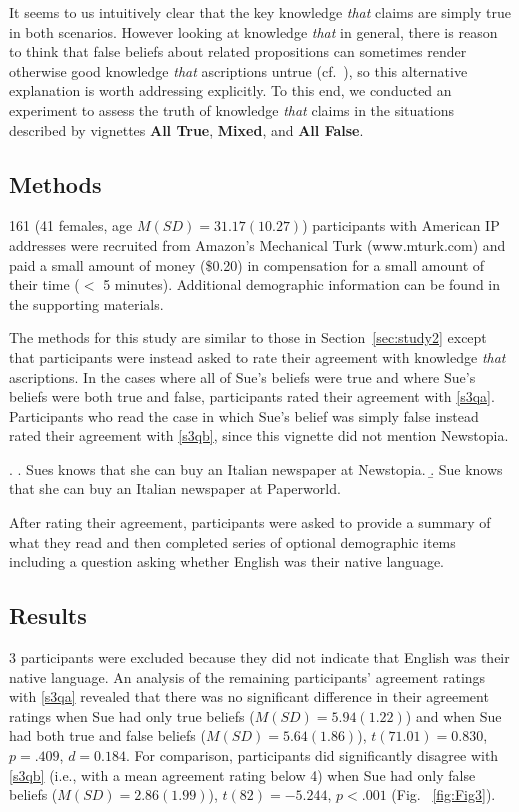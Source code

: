 \documentclass[a4paper]{article}
\begin{document}
It seems to us intuitively clear that the key knowledge \textit{that} claims are simply true in both scenarios. However looking at knowledge \textit{that} in general, there is reason to think that false beliefs about related propositions can sometimes render otherwise good knowledge \textit{that} ascriptions untrue (cf.\ \cite{fakebarn}), so this alternative explanation is worth addressing explicitly. To this end, we conducted an experiment to assess the truth of knowledge \textit{that} claims in the situations described by vignettes \textbf{All True}, \textbf{Mixed}, and \textbf{All False}.


\subsection{Methods}

161 (41 females, age $M(SD) = 31.17(10.27)$) participants with American IP addresses were recruited from Amazon's Mechanical Turk (www.mturk.com) and paid a small amount of money (\$0.20) in compensation for a small amount of their time ($<$ 5 minutes). Additional demographic information can be found in the supporting materials.

The methods for this study are similar to those in Section~\ref{sec:study2} except that participants were instead asked to rate their agreement with knowledge \textit{that} ascriptions. In the cases where all of Sue's beliefs were true and where Sue's beliefs were both true and false, participants rated their agreement with \ref{s3qa}. Participants who read the case in which Sue's belief was simply false instead rated their agreement with \ref{s3qb}, since this vignette did not mention Newstopia.

\ex. 
\a. \label{s3qa} Sues knows that she can buy an Italian newspaper at Newstopia.
\b. \label{s3qb} Sue knows that she can buy an Italian newspaper at Paperworld. 

After rating their agreement, participants were asked to provide a summary of what they read and then completed series of optional demographic items including a question asking whether English was their native language.

\subsection{Results}

3 participants were excluded because they did not indicate that English was their native language. An analysis of the remaining participants' agreement ratings with \ref{s3qa} revealed that there was no significant difference in their agreement ratings when Sue had only true beliefs ($M( SD) = 5.94(1.22)$) and when Sue had both true and false beliefs ($M( SD) = 5.64(1.86)$), $ t(71.01) = 0.830$, $p= .409$, $d = 0.184$. For comparison, participants did significantly disagree with \ref{s3qb} (i.e., with a mean agreement rating below 4) when Sue had only false beliefs ($M(SD) = 2.86(1.99)$), $t(82) = -5.244$, $p< .001$ (Fig. ~\ref{fig:Fig3}).
\end{document}
